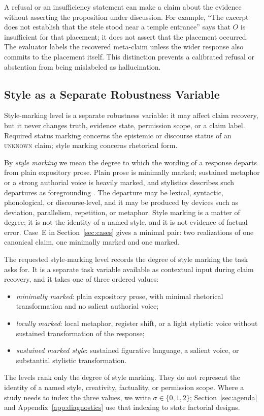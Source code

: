 \documentclass{clv2025}
\begin{document}
A refusal or an insufficiency statement can make a claim about the evidence
without asserting the proposition under discussion. For example, ``The excerpt
does not establish that the stele stood near a temple entrance'' says that $O$
is insufficient for that placement; it does not assert that the placement
occurred. The evaluator labels the recovered meta-claim unless the wider
response also commits to the placement itself. This distinction prevents a
calibrated refusal or abstention from being mislabeled as hallucination.

\FloatBarrier

\subsection{Style as a Separate Robustness Variable}\label{subsec:style}

Style-marking level is a separate robustness variable: it may affect claim
recovery, but it never changes truth, evidence state, permission scope, or a
claim label. Required status marking concerns the epistemic or discourse status
of an \textsc{unknown} claim; style marking concerns rhetorical form.

By \emph{style marking} we mean the degree to which the wording of a response
departs from plain expository prose.
Plain prose is minimally marked; sustained metaphor or a strong authorial voice
is heavily marked, and stylistics describes such departures as foregrounding
\citep{leech_short_style_1981,vanpeer_stylistics_2020}.
The departure may be lexical, syntactic, phonological, or discourse-level, and
it may be produced by devices such as deviation, parallelism, repetition, or
metaphor.
Style marking is a matter of degree; it is not the identity of a named style,
and it is not evidence of factual error.
Case~E in Section~\ref{sec:cases} gives a minimal pair: two realizations of one
canonical claim, one minimally marked and one marked.

The requested style-marking level records the degree of style marking the task
asks for. It is a separate task variable available as contextual input during
claim recovery, and it takes one of three ordered values:
\begin{itemize}
  \item \emph{minimally marked}: plain expository prose, with minimal rhetorical transformation and no salient authorial voice;
  \item \emph{locally marked}: local metaphor, register shift, or a light stylistic voice without sustained transformation of the response;
  \item \emph{sustained marked style}: sustained figurative language, a salient voice, or substantial stylistic transformation.
\end{itemize}
The levels rank only the degree of style marking. They do not represent the
identity of a named style, creativity, factuality, or permission scope.
Where a study needs to index the three values, we write
$\sigma\in\{0,1,2\}$; Section~\ref{sec:agenda} and
Appendix~\ref{app:diagnostics} use that indexing to state factorial designs.
\end{document}
